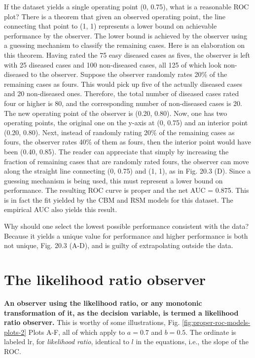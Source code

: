 \documentclass[
]{book}
\begin{document}
If the dataset yields a single operating point (0, 0.75), what is a reasonable ROC plot? There is a theorem that given an observed operating point, the line connecting that point to (1, 1) represents a lower bound on achievable performance by the observer. The lower bound is achieved by the observer using a guessing mechanism to classify the remaining cases. Here is an elaboration on this theorem. Having rated the 75 easy diseased cases as fives, the observer is left with 25 diseased cases and 100 non-diseased cases, all 125 of which look non-diseased to the observer. Suppose the observer randomly rates 20\% of the remaining cases as fours. This would pick up five of the actually diseased cases and 20 non-diseased ones. Therefore, the total number of diseased cases rated four or higher is 80, and the corresponding number of non-diseased cases is 20. The new operating point of the observer is (0.20, 0.80). Now, one has two operating points, the original one on the y-axis at (0, 0.75) and an interior point (0.20, 0.80). Next, instead of randomly rating 20\% of the remaining cases as fours, the observer rates 40\% of them as fours, then the interior point would have been (0.40, 0.85). The reader can appreciate that simply by increasing the fraction of remaining cases that are randomly rated fours, the observer can move along the straight line connecting (0, 0.75) and (1, 1), as in Fig. 20.3 (D). Since a guessing mechanism is being used, this must represent a lower bound on performance. The resulting ROC curve is proper and the net AUC = 0.875. This is in fact the fit yielded by the CBM and RSM models for this dataset. The empirical AUC also yields this result.

Why should one select the lowest possible performance consistent with the data? Because it yields a unique value for performance and higher performance is both not unique, Fig. 20.3 (A-D), and is guilty of extrapolating outside the data.

\hypertarget{proper-roc-models-likelihood-ratio-observer}{%
\section{The likelihood ratio observer}\label{proper-roc-models-likelihood-ratio-observer}}

\textbf{An observer using the likelihood ratio, or any monotonic transformation of it, as the decision variable, is termed a likelihood ratio observer.} This is worthy of some illustrations, Fig. \ref{fig:proper-roc-models-plots-2} Plots A-F, all of which apply to \(a = 0.7\) and \(b = 0.5\). The ordinate is labeled \(\text{lr}\), for \emph{likelihood ratio}, identical to \(l\) in the equations, i.e., the slope of the ROC.
\end{document}
